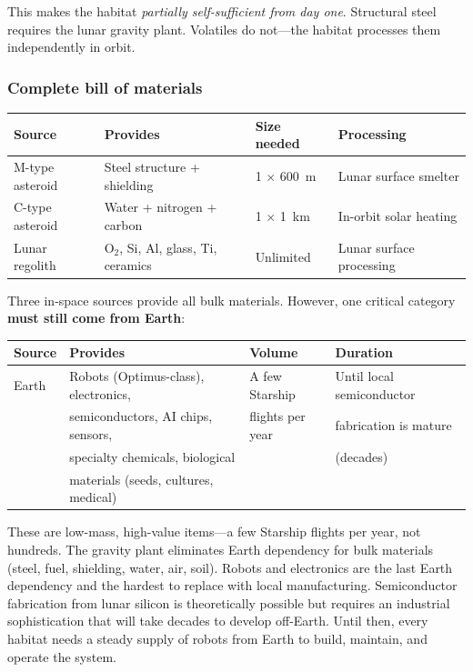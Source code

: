 \documentclass[12pt,letterpaper]{article}
\begin{document}
This makes the habitat \emph{partially self-sufficient from day one}. Structural steel requires the lunar gravity plant. Volatiles do not---the habitat processes them independently in orbit.

\subsubsection{Complete bill of materials}

\begin{center}
\small
\begin{tabular}{llll}
\toprule
\textbf{Source} & \textbf{Provides} & \textbf{Size needed} & \textbf{Processing} \\
\midrule
M-type asteroid & Steel structure + shielding & 1 $\times$ 600~m & Lunar surface smelter \\
C-type asteroid & Water + nitrogen + carbon & 1 $\times$ 1~km & In-orbit solar heating \\
Lunar regolith & O$_2$, Si, Al, glass, Ti, ceramics & Unlimited & Lunar surface processing \\
\bottomrule
\end{tabular}
\end{center}

Three in-space sources provide all bulk materials. However, one critical category \textbf{must still come from Earth}:

\begin{center}
\small
\begin{tabular}{llll}
\toprule
\textbf{Source} & \textbf{Provides} & \textbf{Volume} & \textbf{Duration} \\
\midrule
Earth & Robots (Optimus-class), electronics, & A few Starship & Until local semiconductor \\
 & semiconductors, AI chips, sensors, & flights per year & fabrication is mature \\
 & specialty chemicals, biological & & (decades) \\
 & materials (seeds, cultures, medical) & & \\
\bottomrule
\end{tabular}
\end{center}

These are low-mass, high-value items---a few Starship flights per year, not hundreds. The gravity plant eliminates Earth dependency for bulk materials (steel, fuel, shielding, water, air, soil). Robots and electronics are the last Earth dependency and the hardest to replace with local manufacturing. Semiconductor fabrication from lunar silicon is theoretically possible but requires an industrial sophistication that will take decades to develop off-Earth. Until then, every habitat needs a steady supply of robots from Earth to build, maintain, and operate the system.
\end{document}
